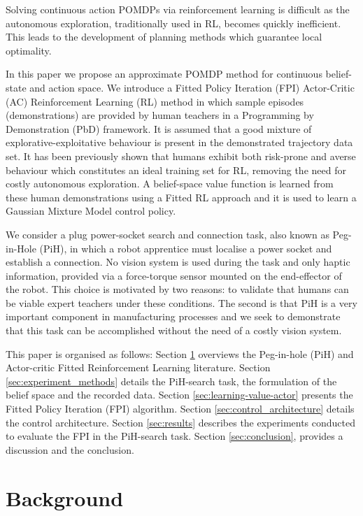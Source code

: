 \documentclass[final,5p,times,twocolumn]{elsarticle}
\begin{document}
Solving continuous action POMDPs via reinforcement learning 
is difficult as the autonomous exploration, traditionally used in RL, becomes quickly inefficient. 
This leads to the development of planning methods which guarantee local optimality. 

In this paper we propose an approximate POMDP method for continuous belief-state and action space. We introduce a 
Fitted Policy Iteration (FPI) Actor-Critic (AC) Reinforcement Learning (RL) method in which sample episodes (demonstrations)
are provided by human teachers in a Programming by Demonstration (PbD) framework. It is assumed that 
a good mixture of explorative-exploitative behaviour is present in the demonstrated trajectory data set.
It has been previously shown \cite{Chambrier2014} that humans exhibit both risk-prone and averse behaviour which constitutes an ideal training set for RL, 
removing the need for costly autonomous exploration. A belief-space value function is learned from these 
human demonstrations using a Fitted RL approach and it is used to learn a Gaussian Mixture Model control policy.

We consider a plug power-socket search and connection task, also known as Peg-in-Hole (PiH), in which a 
robot apprentice must localise a power socket and establish a connection. 
No vision system is used during the task and only haptic information, provided via 
a force-torque sensor mounted on the end-effector of the robot. This choice is motivated by two reasons:
to validate that humans can be viable expert teachers under these conditions. The second is that PiH is a very important component 
in manufacturing processes and we seek to demonstrate that this task can be accomplished without the need of
a costly vision system. 

This paper is organised as follows: Section \ref{sec:related_work} overviews the Peg-in-hole (PiH) and Actor-critic Fitted Reinforcement 
Learning literature. Section \ref{sec:experiment_methods} details the PiH-search task, the formulation of the belief space and the recorded data. Section \ref{sec:learning-value-actor} presents the Fitted Policy Iteration (FPI) algorithm.
Section \ref{sec:control_architecture} details the control architecture. Section \ref{sec:results} describes the experiments 
conducted to evaluate the FPI in the PiH-search task. Section \ref{sec:conclusion}, provides a discussion and the conclusion.


\section{Background}\label{sec:related_work}
\end{document}
